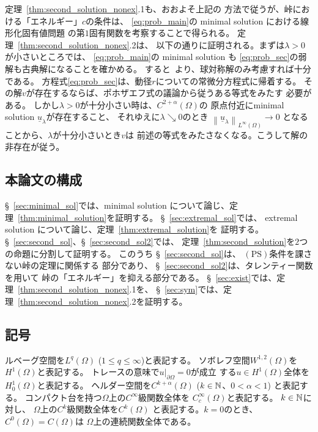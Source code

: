定理~\ref{thm:second_solution_nonex}.1も、おおよそ上記の
方法で従うが、峠における「エネルギー」$c$の条件は、
\ref{eq:prob_main}の minimal solution における線形化固有値問題
の第$1$固有関数を考察することで得られる。
定理~\ref{thm:second_solution_nonex}.2は、
以下の通りに証明される。まずは$\lambda > 0$が小さいところでは、
\ref{eq:prob_main}の minimal solution も
\ref{eq:prob_sec}の弱解も古典解になることを確かめる。
すると\cite{MR544879}~より、球対称解のみ考慮すれば十分である。
方程式\ref{eq:prob_sec}は、動径$r$についての常微分方程式に帰着する。
その解$v$が存在するならば、ポホザエフ式の議論から従うある等式をみたす
必要がある。
しかし$\lambda > 0$が十分小さい時は、$C^{2 + \alpha}(\Omega)$の
原点付近にminimal solution $\underline{u}_\lambda$が存在すること、
それゆえに$\lambda \searrow 0$のとき
$\left\| \underline{u}_\lambda \right\|_{L^\infty(\Omega)} \to 0$
となることから、$\lambda$が十分小さいとき$v$は
前述の等式をみたさなくなる。こうして解の非存在が従う。

\subsection{本論文の構成}

\S~\ref{sec:minimal_sol}では、minimal solution について論じ、定
理~\ref{thm:minimal_solution}を証明する。
\S~\ref{sec:extremal_sol}では、
extremal solution について論じ、定理~\ref{thm:extremal_solution}を
証明する。
\S~\ref{sec:second_sol}、\S~\ref{sec:second_sol2}では、
定理~\ref{thm:second_solution}を$2$つの命題に分割して証明する。
このうち
\S~\ref{sec:second_sol}は、
$(\mathrm{PS})$条件を課さない峠の定理に関係する
部分であり、
\S~\ref{sec:second_sol2}は、タレンティー関数を用いて
峠の「エネルギー」を抑える部分である。
\S~\ref{sec:exist}では、定理~\ref{thm:second_solution_nonex}.1を、
\S~\ref{sec:sym}では、定理~\ref{thm:second_solution_nonex}.2を証明する。

\subsection{記号}

ルベーグ空間を$L^q(\Omega)$ ($1 \leq q \leq \infty$)と表記する。
ソボレフ空間$W^{1, 2}(\Omega)$を$H^1(\Omega)$と表記する。
トレースの意味で$u |_{\partial \Omega} = 0$が成立
する$u \in H^1(\Omega)$全体を$H_0^1(\Omega)$と表記する。
ヘルダー空間を$C^{k + \alpha}(\Omega)$ ($k \in \mathbb{N}$、$0 < \alpha < 1$)
と表記する。
コンパクト台を持つ$\Omega$上の$C^\infty$級関数全体を
$C^\infty_c (\Omega)$と表記する。
$k \in \mathbb{N}$に対し、
$\Omega$上の$C^k$級関数全体を$C^k(\Omega)$
と表記する。$k = 0$のとき、$C^0(\Omega) = C(\Omega)$は
$\Omega$上の連続関数全体である。

